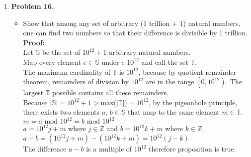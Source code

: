 \documentclass[letterpaper,fleqn]{article}
\begin{document}
\begin{enumerate}
		\item [] \textbf{Problem 16.}
		\begin{itemize}
			\item [] Show that among any set of arbitrary (1 trillion + 1) natural numbers, one can find two numbers so that their difference is divisible by 1 trillion. \\
			\textbf{Proof:} \\
			Let $\mathbb{S}$ be the set of $10^{12}+1$ arbitrary natural numbers. \\
			Map every element $e \in \mathbb{S}$ under $e$  $10^{12}$ and call the set $\mathbb{T}$. \\
			The maximum cardinality of $\mathbb{T}$ is $10^{12}$, because by quotient remainder theorem, remainders of division by $10^{12}$ are in the range $\left[0,10^{12}\right)$. The largest $\mathbb{T}$ possible contains all these remainders. \\
			Because $|\mathbb{S}|=10^{12}+1 > \text{max}(|\mathbb{T}|$)$=10^{12}$, by the pigeonhole principle, there exists two elements $a,\, b \in \mathbb{S}$ that map to the same element $m \in \mathbb{T}$. \\
			$m=a\text{ mod }10^{12} = b\text{ mod }10^{12}$ \\
			$a=10^{12}j+m$ where $j \in \mathbb{Z}$ and $b=10^{12}k+m$ where $k \in \mathbb{Z}$. \\
			$a-b = (10^{12}j+m)-(10^{12}k+m)=10^{12}(j-k)$ \\
			The difference $a-b$ is a multiple of $10^{12}$ therefore proposition is true. \\
		\end{itemize}
		
	\end{enumerate}
\end{document}

